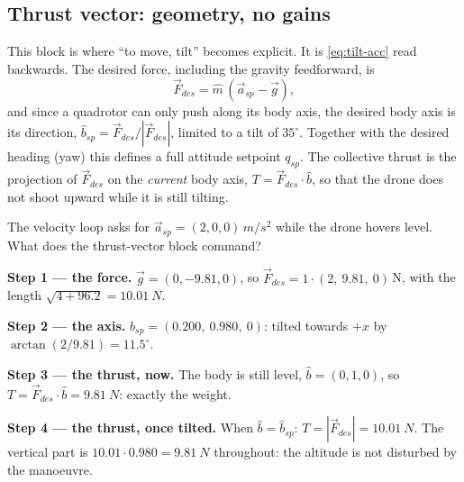 \subsection{Thrust vector: geometry, no gains}
This block is where \enquote{to move, tilt} becomes explicit. It is \cref{eq:tilt-acc} read backwards. The desired force, including the gravity feedforward, is
\begin{equation}\label{eq:cascade-fdes}
  \vec F_{des} = \hat m\,(\vec a_{sp} - \vec g),
\end{equation}
and since a quadrotor can only push along its body axis, the desired body axis is its direction, $\hat b_{sp} = \vec F_{des}/|\vec F_{des}|$, limited to a tilt of $35^\circ$. Together with the desired heading (yaw) this defines a full attitude setpoint $q_{sp}$. The collective thrust is the projection of $\vec F_{des}$ on the \emph{current} body axis, $T = \vec F_{des}\cdot\hat b$, so that the drone does not shoot upward while it is still tilting.

\begin{example}
\label{ex:cascade-tv}
The velocity loop asks for $\vec a_{sp} = (2, 0, 0)\,\si{m/s^2}$ while the drone hovers level. What does the thrust-vector block command?

\textbf{Step 1 — the force.} $\vec g = (0, -9.81, 0)$, so $\vec F_{des} = 1 \cdot (2,\ 9.81,\ 0)$\,N, with the length $\sqrt{4 + 96.2} = \SI{10.01}{N}$.

\textbf{Step 2 — the axis.} $\hat b_{sp} = (0.200,\ 0.980,\ 0)$: tilted towards $+x$ by $\arctan(2/9.81) = 11.5^\circ$.

\textbf{Step 3 — the thrust, now.} The body is still level, $\hat b = (0, 1, 0)$, so $T = \vec F_{des}\cdot\hat b = \SI{9.81}{N}$: exactly the weight.

\textbf{Step 4 — the thrust, once tilted.} When $\hat b = \hat b_{sp}$: $T = |\vec F_{des}| = \SI{10.01}{N}$. The vertical part is $10.01 \cdot 0.980 = \SI{9.81}{N}$ throughout: the altitude is not disturbed by the manoeuvre.
\end{example}

